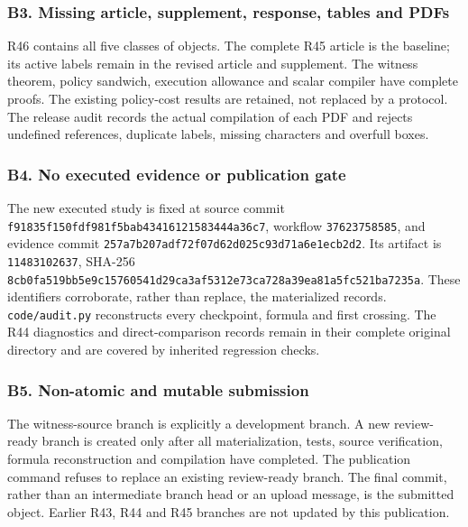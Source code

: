 \documentclass[ecta,nameyear,draft]{econsocart}
\begin{document}
\hypertarget{b3-missing-article-supplement-response-tables-and-pdfs}{%
\subsubsection{B3. Missing article, supplement, response, tables and
PDFs}\label{b3-missing-article-supplement-response-tables-and-pdfs}}

R46 contains all five classes of objects. The complete R45 article is
the baseline; its active labels remain in the revised article and
supplement. The witness theorem, policy sandwich, execution allowance
and scalar compiler have complete proofs. The existing policy-cost
results are retained, not replaced by a protocol. The release audit
records the actual compilation of each PDF and rejects undefined
references, duplicate labels, missing characters and overfull boxes.

\hypertarget{b4-no-executed-evidence-or-publication-gate}{%
\subsubsection{B4. No executed evidence or publication
gate}\label{b4-no-executed-evidence-or-publication-gate}}

The new executed study is fixed at source commit
\nolinkurl{f91835f150fdf981f5bab43416121583444a36c7}, workflow
\nolinkurl{37623758585}, and evidence commit
\nolinkurl{257a7b207adf72f07d62d025c93d71a6e1ecb2d2}. Its artifact is
\nolinkurl{11483102637}, SHA-256
\nolinkurl{8cb0fa519bb5e9c15760541d29ca3af5312e73ca728a39ea81a5fc521ba7235a}.
These identifiers corroborate, rather than replace, the materialized
records. \nolinkurl{code/audit.py} reconstructs every checkpoint, formula
and first crossing. The R44 diagnostics and direct-comparison records
remain in their complete original directory and are covered by inherited
regression checks.

\hypertarget{b5-non-atomic-and-mutable-submission}{%
\subsubsection{B5. Non-atomic and mutable
submission}\label{b5-non-atomic-and-mutable-submission}}

The witness-source branch is explicitly a development branch. A new
review-ready branch is created only after all materialization, tests,
source verification, formula reconstruction and compilation have
completed. The publication command refuses to replace an existing
review-ready branch. The final commit, rather than an intermediate
branch head or an upload message, is the submitted object. Earlier R43,
R44 and R45 branches are not updated by this publication.
\end{document}
